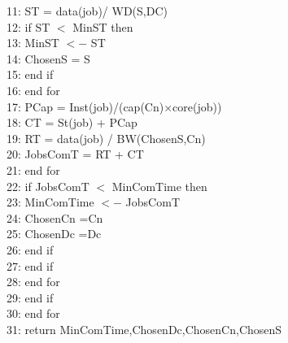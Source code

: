 \documentclass[12pt,a4paper]{report}
\begin{document}
11:\hspace{0.5 in} ST = data(job)/ WD(S,DC) \\
12:\hspace{0.6 in} if ST $<$ MinST then \\
13:\hspace{0.7 in} MinST $<-$ ST \\
14:\hspace{0.7 in} ChosenS = S \\
15: \hspace{0.6 in}end if \\
16: \hspace{0.5 in}end for \\
17: \hspace{0.5 in}PCap = Inst(job)/(cap(Cn)×core(job)) \\
18: \hspace{0.5 in}CT = St(job) + PCap \\
19: \hspace{0.5 in}RT = data(job) / BW(ChosenS,Cn) \\
20: \hspace{0.5 in}JobsComT = RT + CT \\
21: \hspace{0.4 in}end for \\
22: \hspace{0.5 in}if JobsComT $<$ MinComTime then \\
23: \hspace{0.5 in}MinComTime $<-$ JobsComT \\
24: \hspace{0.5 in}ChosenCn =Cn \\
25: \hspace{0.5 in}ChosenDc =Dc \\
26: \hspace{0.4 in}end if \\
27:\hspace{0.3 in} end if \\
28:\hspace{0.2 in} end for \\
29:\hspace{0.1 in} end if \\
30: end for \\
31: return MinComTime,ChosenDc,ChosenCn,ChosenS\\





\end{document}
